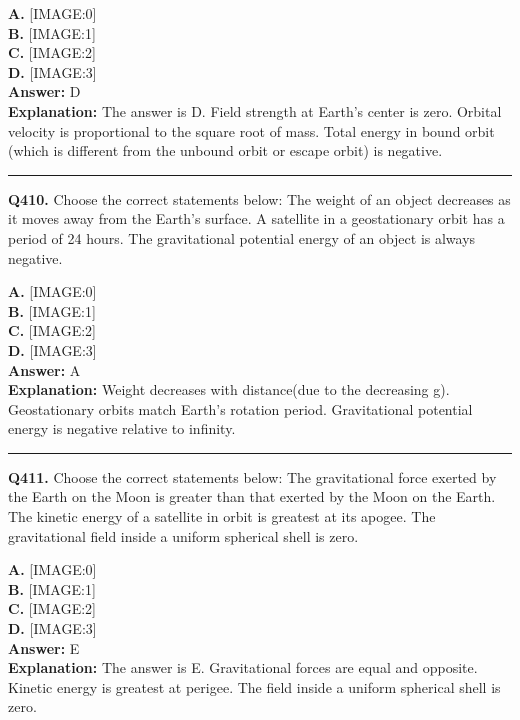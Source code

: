 \documentclass[12pt]{article}
\begin{document}
\textbf{A.} [IMAGE:0] \\
\textbf{B.} [IMAGE:1] \\
\textbf{C.} [IMAGE:2] \\
\textbf{D.} [IMAGE:3] \\

\textbf{Answer:} D \\
\textbf{Explanation:} The answer is D. Field strength at Earth's center is zero. Orbital velocity is proportional to the square root of mass. Total energy in bound orbit (which is different from the unbound orbit or escape orbit) is negative.

\hrule
\vspace{1em}


\noindent
\textbf{Q410.} Choose the correct statements below:
The weight of an object decreases as it moves away from the Earth's surface.
A satellite in a geostationary orbit has a period of 24 hours.
The gravitational potential energy of an object is always negative.



\textbf{A.} [IMAGE:0] \\
\textbf{B.} [IMAGE:1] \\
\textbf{C.} [IMAGE:2] \\
\textbf{D.} [IMAGE:3] \\

\textbf{Answer:} A \\
\textbf{Explanation:} Weight decreases with distance(due to the decreasing g). Geostationary orbits match Earth's rotation period. Gravitational potential energy is negative relative to infinity.

\hrule
\vspace{1em}


\noindent
\textbf{Q411.} Choose the correct statements below:
The gravitational force exerted by the Earth on the Moon is greater than that exerted by the Moon on the Earth.
The kinetic energy of a satellite in orbit is greatest at its apogee.
The gravitational field inside a uniform spherical shell is zero.



\textbf{A.} [IMAGE:0] \\
\textbf{B.} [IMAGE:1] \\
\textbf{C.} [IMAGE:2] \\
\textbf{D.} [IMAGE:3] \\

\textbf{Answer:} E \\
\textbf{Explanation:} The answer is E. Gravitational forces are equal and opposite. Kinetic energy is greatest at perigee. The field inside a uniform spherical shell is zero.
\end{document}
